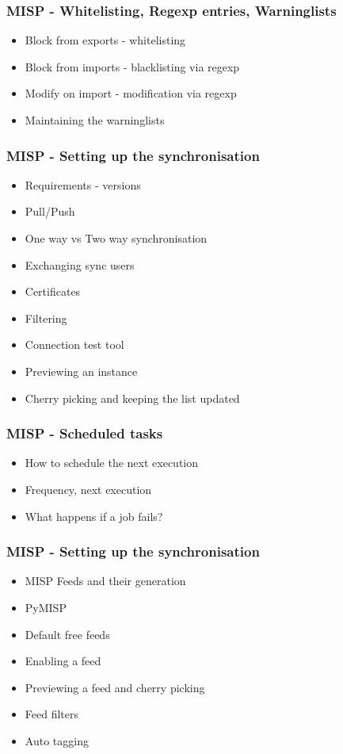 \begin{frame}
    \frametitle{MISP - Whitelisting, Regexp entries, Warninglists}
        \begin{itemize}
            \item Block from exports - whitelisting
            \item Block from imports - blacklisting via regexp
            \item Modify on import - modification via regexp
            \item Maintaining the warninglists
        \end{itemize}
\end{frame}

\begin{frame}
    \frametitle{MISP - Setting up the synchronisation}
        \begin{itemize}
            \item Requirements - versions
            \item Pull/Push
            \item One way vs Two way synchronisation
            \item Exchanging sync users
            \item Certificates
            \item Filtering
            \item Connection test tool
            \item Previewing an instance
            \item Cherry picking and keeping the list updated
        \end{itemize}
\end{frame}

\begin{frame}
    \frametitle{MISP - Scheduled tasks}
        \begin{itemize}
            \item How to schedule the next execution
            \item Frequency, next execution
            \item What happens if a job fails?
        \end{itemize}
\end{frame}

\begin{frame}
    \frametitle{MISP - Setting up the synchronisation}
        \begin{itemize}
            \item MISP Feeds and their generation
            \item PyMISP
            \item Default free feeds
            \item Enabling a feed
            \item Previewing a feed and cherry picking
            \item Feed filters
            \item Auto tagging
        \end{itemize}
\end{frame}

